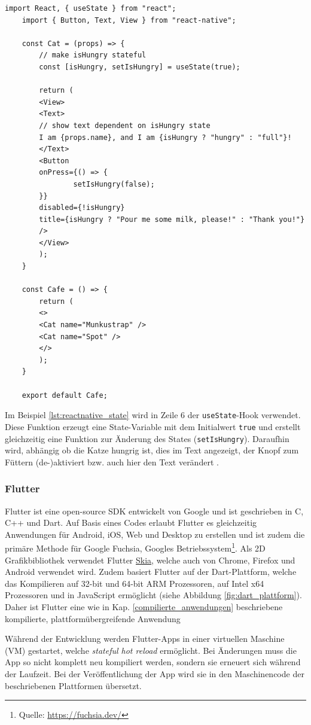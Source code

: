 \begin{lstlisting}[caption=State mit \texttt{useState} Hook, label=lst:reactnative_state]
	import React, { useState } from "react";
	import { Button, Text, View } from "react-native";
	
	const Cat = (props) => {
		// make isHungry stateful
		const [isHungry, setIsHungry] = useState(true);
		
		return (
		<View>
		<Text>
		// show text dependent on isHungry state
		I am {props.name}, and I am {isHungry ? "hungry" : "full"}!
		</Text>
		<Button
		onPress={() => {
				setIsHungry(false);
		}}
		disabled={!isHungry}
		title={isHungry ? "Pour me some milk, please!" : "Thank you!"}
		/>
		</View>
		);
	}
	
	const Cafe = () => {
		return (
		<>
		<Cat name="Munkustrap" />
		<Cat name="Spot" />
		</>
		);
	}
	
	export default Cafe;
\end{lstlisting}

\noindent
Im Beispiel \ref{lst:reactnative_state} wird in Zeile 6 der \texttt{useState}-Hook verwendet. Diese Funktion erzeugt eine State-Variable mit dem Initialwert \texttt{true} und erstellt gleichzeitig eine Funktion zur Änderung des States (\texttt{setIsHungry}). Daraufhin wird, abhängig ob die Katze hungrig ist, dies im Text angezeigt, der Knopf zum Füttern (de-)aktiviert bzw. auch hier den Text verändert \cite{reactnative2021}.\\

\subsubsection{Flutter}
\label{sec:flutter}
Flutter ist eine open-source SDK entwickelt von Google und ist geschrieben in C, C++ und Dart.
Auf Basis eines Codes erlaubt Flutter es gleichzeitig Anwendungen für Android, iOS, Web und Desktop zu erstellen und ist zudem die primäre Methode für Google Fuchsia, Googles Betriebssystem\footnote{Quelle: \url{https://fuchsia.dev/}}.
Als 2D Grafikbibliothek verwendet Flutter  \href{https://skia.org/}{Skia}, welche auch von Chrome, Firefox und Android verwendet wird. Zudem basiert Flutter auf der Dart-Plattform, welche das Kompilieren auf 32-bit und 64-bit ARM Prozessoren, auf Intel x64 Prozessoren und in JavaScript ermöglicht (siehe Abbildung \ref{fig:dart_plattform}). Daher ist Flutter eine wie in Kap. \ref{compilierte_anwendungen} beschriebene kompilierte, plattformübergreifende Anwendung

\noindent
Während der Entwicklung werden Flutter-Apps in einer virtuellen Maschine (VM) gestartet, welche \textit{stateful hot reload} ermöglicht. Bei Änderungen muss die App so nicht komplett neu kompiliert werden, sondern sie erneuert sich während der Laufzeit. Bei der Veröffentlichung der App wird sie in den Maschinencode der beschriebenen Plattformen übersetzt.\\


